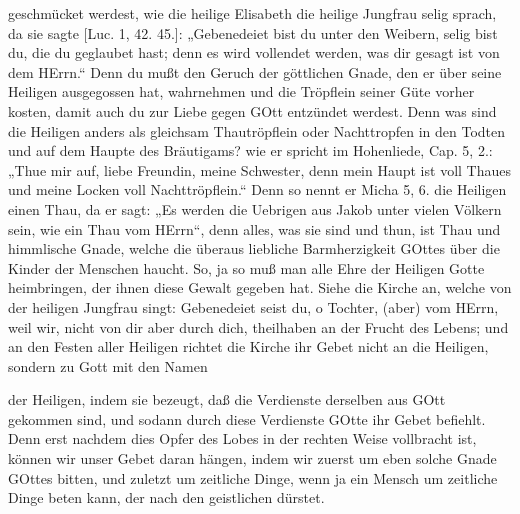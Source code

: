 geschmücket werdest, wie die heilige Elisabeth die heilige Jungfrau selig sprach, da sie sagte [Luc. 1, 42. 45.]: „Gebenedeiet bist du unter den Weibern, selig bist du, die du geglaubet hast; denn es wird vollendet werden, was dir gesagt ist von dem HErrn.“ Denn du mußt den Geruch der göttlichen Gnade, den er über seine Heiligen ausgegossen hat, wahrnehmen und die Tröpflein seiner Güte vorher kosten, damit auch du zur Liebe gegen GOtt entzündet werdest. Denn was sind die Heiligen anders als gleichsam Thautröpflein oder Nachttropfen in den Todten und auf dem Haupte des Bräutigams? wie er spricht im Hohenliede, Cap. 5, 2.: „Thue mir auf, liebe Freundin, meine Schwester, denn mein Haupt ist voll Thaues und meine Locken voll Nachttröpflein.“ Denn so nennt er Micha 5, 6. die Heiligen einen Thau, da er sagt: „Es werden die Uebrigen aus Jakob unter vielen Völkern sein, wie ein Thau vom HErrn“, denn alles, was sie sind und thun, ist Thau und himmlische Gnade, welche die überaus liebliche Barmherzigkeit GOttes über die Kinder der Menschen haucht. So, ja so muß man alle Ehre der Heiligen Gotte heimbringen, der ihnen diese Gewalt gegeben hat. Siehe die Kirche an, welche von der heiligen Jungfrau singt: Gebenedeiet seist du, o Tochter, (aber) vom HErrn, weil wir, nicht von dir aber durch dich, theilhaben an der Frucht des Lebens; und an den Festen aller Heiligen richtet die Kirche ihr Gebet nicht an die Heiligen, sondern zu Gott mit den Namen

der Heiligen, indem sie bezeugt, daß die Verdienste derselben aus GOtt gekommen sind, und sodann durch diese Verdienste GOtte ihr Gebet befiehlt. Denn erst nachdem dies Opfer des Lobes in der rechten Weise vollbracht ist, können wir unser Gebet daran hängen, indem wir zuerst um eben solche Gnade GOttes bitten, und zuletzt um zeitliche Dinge, wenn ja ein Mensch um zeitliche Dinge beten kann, der nach den geistlichen dürstet.

